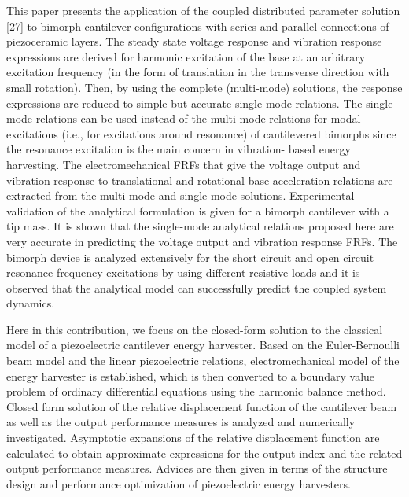 \documentclass{article}
\begin{document}
This paper presents the application of the coupled distributed parameter solution [27] to bimorph cantilever configurations with series and parallel connections of piezoceramic layers. The steady state voltage response and vibration response expressions are derived for harmonic excitation of the base at an arbitrary excitation frequency (in the form of translation in the transverse direction with small rotation). Then, by using the complete (multi-mode) solutions, the response expressions are reduced to simple but accurate single-mode relations. The single-mode relations can be used instead of the multi-mode relations for modal excitations (i.e., for excitations around resonance) of cantilevered bimorphs since the resonance excitation is the main concern in vibration- based energy harvesting. The electromechanical FRFs that give the voltage output and vibration response-to-translational and rotational base acceleration relations are extracted from the multi-mode and single-mode solutions. Experimental validation of the analytical formulation is given for a bimorph cantilever with a tip mass. It is shown that the single-mode analytical relations proposed here are very accurate in predicting the voltage output and vibration response FRFs. The bimorph device is analyzed extensively for the short circuit and open circuit resonance frequency excitations by using different resistive loads and it is observed that the analytical model can successfully predict the coupled system dynamics.



Here in this contribution, we focus on the closed-form solution to the classical model of a piezoelectric cantilever energy harvester. Based on the Euler-Bernoulli beam model and the linear piezoelectric relations, electromechanical model of the energy harvester is established, which is then converted to a boundary value problem of ordinary differential equations using the harmonic balance method. Closed form solution of the relative displacement function of the cantilever beam as well as the output performance measures is analyzed and numerically investigated. Asymptotic expansions of the relative displacement function are calculated to obtain approximate expressions for the output index and the related output performance measures. Advices are then given in terms of the structure design and performance optimization of piezoelectric energy harvesters. 
\end{document}
